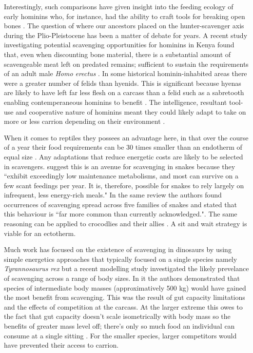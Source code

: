 \documentclass[a4paper,12pt]{article}
\begin{document}
Interestingly, such comparisons have given insight into the feeding ecology of early hominins who, for instance, had the ability to craft tools for breaking open bones \citep{ARCM:ARCM12084}.
The question of where our ancestors placed on the hunter-scavenger axis during the Plio-Pleistocene has been a matter of debate for years.
A recent study investigating potential scavenging opportunities for hominins in Kenya found that, even when discounting bone material, there is a substantial amount of scavengeable meat left on predated remains; sufficient to sustain the requirements of an adult male \textit{Homo erectus} \citep{pobiner2015new}.
In some historical hominin-inhabited areas there were a greater number of felids than hyenids.
This is significant because hyenas are likely to have left far less flesh on a carcass than a felid such as a sabretooth enabling contemperaneous hominins to benefit \citep{pobiner2015new}.
The intelligence, resultant tool-use and cooperative nature of hominins meant they could likely adapt to take on more or less carrion depending on their environment \citep{moleon2014humans}.


When it comes to reptiles they possees an advantage here, in that over the course of a year their food requirements can be 30 times smaller than an endotherm of equal size \citep{Nagy1621}.
Any adaptations that reduce energetic costs are likely to be selected in scavengers.
\cite{devault2002scavenging} suggest this is an avenue for scavenging in snakes because they ``exhibit  exceedingly  low  maintenance  metabolisms,  and most  can  survive  on  a  few  scant  feedings per year.
It  is, therefore, possible for snakes to rely largely  on  infrequent,  less  energy-rich  meals." In the same review the authors found occurrences of scavenging spread across five families of snakes and stated that this behaviour is ``far more common than currently acknowledged."\citep{devault2002scavenging}.
The same reasoning can be applied to crocodlies and their allies \citep{forrest2003evidence}. 
A sit and wait strategy is viable for an ectotherm. 

Much work has focused on the existence of scavenging in dinosaurs by using simple energetics approaches that typically focused on a single species namely \textit{Tyrannosaurus rex} \citep{ruxton2003could,carbone2011intra} but a recent modelling study investigated the likely prevelance of scavenging across a range of body sizes.
In it the authors demonstrated that species of intermediate body masses (approximatively 500 kg) would have gained the most benefit from scavenging.
This was the result of gut capacity limitations and the effects of competition at the carcass.
At the larger extreme this owes to the fact that gut capacity doesn't scale isometrically with body mass so the benefits of greater mass level off; there's only so much food an individual can consume at a single sitting \citep{calder1996size}.
For the smaller species, larger competitors would have prevented their access to carrion.
\end{document}
